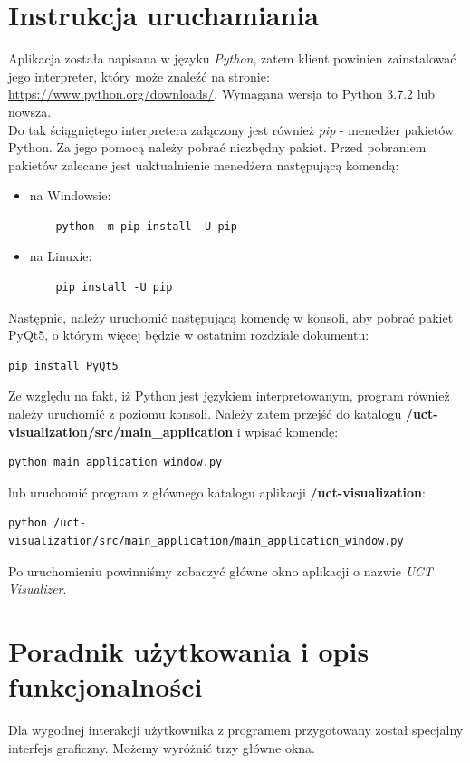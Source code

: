 \documentclass{article}
\let\oldsection\section
\renewcommand\section{\clearpage\oldsection}
\begin{document}
\section{Instrukcja uruchamiania}
Aplikacja została napisana w języku \textit{Python}, zatem klient powinien zainstalować jego interpreter, który może znaleźć na stronie: \url{https://www.python.org/downloads/}. Wymagana wersja to Python 3.7.2 lub nowsza.\\
Do tak ściągniętego interpretera załączony jest również \textit{pip} - menedżer pakietów Python. Za jego pomocą należy pobrać niezbędny pakiet. Przed pobraniem pakietów zalecane jest uaktualnienie menedżera następującą komendą:
\begin{itemize}
	\item na Windowsie:
	\begin{lstlisting}
	python -m pip install -U pip\end{lstlisting}
	\item na Linuxie:
	\begin{lstlisting}
	pip install -U pip\end{lstlisting}
\end{itemize}
Następnie, należy uruchomić następującą komendę w konsoli, aby pobrać pakiet PyQt5, o którym więcej będzie w ostatnim rozdziale dokumentu:
\begin{lstlisting}
pip install PyQt5
\end{lstlisting}
Ze względu na fakt, iż Python jest językiem interpretowanym, program również należy uruchomić \underline{z poziomu konsoli}. 
Należy zatem przejść do katalogu \textbf{/uct-visualization/src/main\_application} i wpisać komendę:
\begin{lstlisting}
python main_application_window.py
\end{lstlisting}
lub uruchomić program z głównego katalogu aplikacji \textbf{/uct-visualization}:
\begin{lstlisting}
python /uct-visualization/src/main_application/main_application_window.py
\end{lstlisting}
Po uruchomieniu powinniśmy zobaczyć główne okno aplikacji o nazwie \textit{UCT Visualizer}.

\section{Poradnik użytkowania i opis funkcjonalności}
Dla wygodnej interakcji użytkownika z programem przygotowany został specjalny interfejs graficzny. Możemy wyróżnić trzy główne okna.
\end{document}
